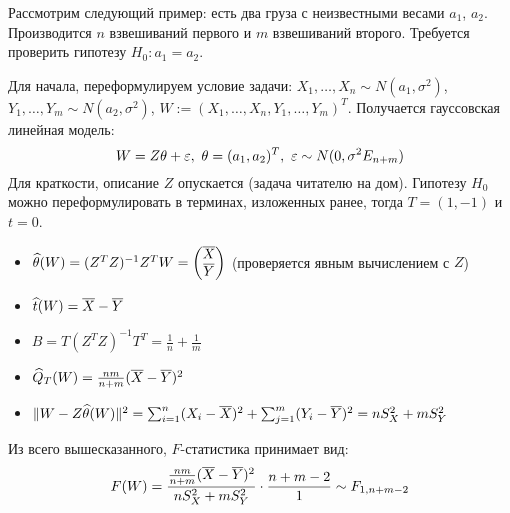 \begin{example}
	Рассмотрим следующий пример: есть два груза с неизвестными весами $a_1$, $a_2$. Производится $n$ взвешиваний первого и $m$ взвешиваний второго. Требуется проверить гипотезу $H_0 \colon a_1 = a_2$.
	
	Для начала, переформулируем условие задачи: $X_1, \ldots, X_n \sim N(a_1, \sigma^2)$, $Y_1, \ldots, Y_m \sim N(a_2, \sigma^2)$, $W := (X_1, \ldots, X_n, Y_1, \ldots, Y_m)^T$. Получается гауссовская линейная модель:
	\[
		W = Z\theta + \varepsilon,\ \theta = (a_1, a_2)^T,\ \varepsilon \sim N(0, \sigma^2E_{n + m})
	\]
	Для краткости, описание $Z$ опускается (задача читателю на дом). Гипотезу $H_0$ можно переформулировать в терминах, изложенных ранее, тогда $T = (1, -1)$ и $t = 0$.
	\begin{itemize}
		\item $\widehat{\theta}(W) = (Z^TZ)^{-1}Z^TW = \begin{pmatrix} \overline{X} \\ \overline{Y}\end{pmatrix}$ (проверяется явным вычислением с $Z$)
		
		\item $\widehat{t}(W) = \overline{X} - \overline{Y}$
		
		\item $B = T(Z^TZ)^{-1}T^T = \frac{1}{n} + \frac{1}{m}$
		
		\item $\widehat{Q}_T(W) = \frac{nm}{n + m}(\overline{X} - \overline{Y})^2$
		
		\item $\|W - Z\widehat{\theta}(W)\|^2 = \sum_{i = 1}^n (X_i - \overline{X})^2 + \sum_{j = 1}^m (Y_i - \overline{Y})^2 = nS_X^2 + mS_Y^2$
	\end{itemize}
	Из всего вышесказанного, $F$-статистика принимает вид:
	\[
		F(W) = \frac{\frac{nm}{n + m}(\overline{X} - \overline{Y})^2}{nS_X^2 + mS_Y^2} \cdot \frac{n + m - 2}{1} \sim F_{1, n + m - 2}
	\]
\end{example}